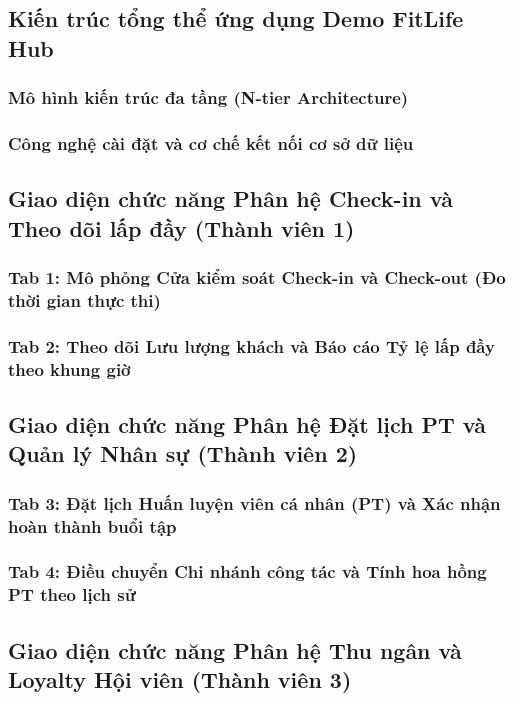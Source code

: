 \subsection{Kiến trúc tổng thể ứng dụng Demo FitLife Hub}

\subsubsection{Mô hình kiến trúc đa tầng (N-tier Architecture)}

\subsubsection{Công nghệ cài đặt và cơ chế kết nối cơ sở dữ liệu}

\subsection{Giao diện chức năng Phân hệ Check-in và Theo dõi lấp đầy (Thành viên 1)}

\subsubsection{Tab 1: Mô phỏng Cửa kiểm soát Check-in và Check-out (Đo thời gian thực thi)}

\subsubsection{Tab 2: Theo dõi Lưu lượng khách và Báo cáo Tỷ lệ lấp đầy theo khung giờ}

\subsection{Giao diện chức năng Phân hệ Đặt lịch PT và Quản lý Nhân sự (Thành viên 2)}

\subsubsection{Tab 3: Đặt lịch Huấn luyện viên cá nhân (PT) và Xác nhận hoàn thành buổi tập}

\subsubsection{Tab 4: Điều chuyển Chi nhánh công tác và Tính hoa hồng PT theo lịch sử}

\subsection{Giao diện chức năng Phân hệ Thu ngân và Loyalty Hội viên (Thành viên 3)}

